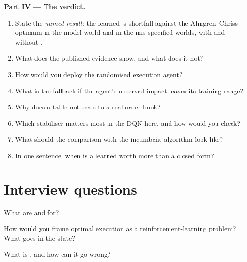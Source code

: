 \begin{problem}
\medskip\noindent\textbf{Part IV --- The verdict.}
\begin{enumerate}[resume]
\item State the \emph{named result}: the learned 's shortfall against the Almgren--Chriss optimum in the model world and
in the mis-specified worlds, with and without .
\item What does the published evidence show, and what does it not?
\item How would you deploy the randomised execution agent?
\item What is the fallback if the agent's observed impact leaves its training range?
\item Why does a table not scale to a real order book?
\item Which stabiliser matters most in the DQN here, and how would you check?
\item What should the comparison with the incumbent algorithm look like?
\item In one sentence: when is a learned  worth more than a closed form?
\end{enumerate}
\end{problem}

\section{Interview questions}

\begin{interviewq}\label{iq:ml:reinforcement-learning-for-execution-and-market-making:1}
What are  and  for?
\end{interviewq}

\begin{interviewq}\label{iq:ml:reinforcement-learning-for-execution-and-market-making:2}
How would you frame optimal execution as a reinforcement-learning problem? What goes in the state?
\end{interviewq}

\begin{interviewq}\label{iq:ml:reinforcement-learning-for-execution-and-market-making:3}
What is , and how can it go wrong?
\end{interviewq}

